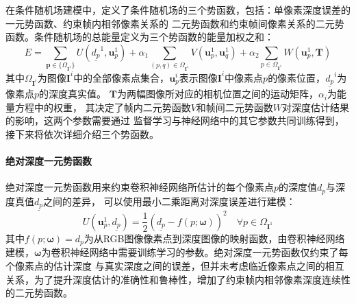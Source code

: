 在条件随机场建模中，定义了条件随机场的三个势函数，包括：单像素深度误差的一元势函数、约束帧内相邻像素关系的
二元势函数和约束帧间像素关系的二元势函数。条件随机场的总能量定义为三个势函数的能量加权之和：
\begin{equation}
    E = \sum_{\mathbf{p}\in \{\Omega_{\mathbf{I}^1}\}} U(\underline{d_{p}}^{1},\mathbf{u}_p^{1})+\alpha_1\sum_{(p,q)\in \Omega_{\mathbf{I}^1}}V(\mathbf{u}_p^1,\mathbf{u}_q^1)
    +\alpha_2\sum_{p\in\Omega_{\mathbf{I}^1}}W(\mathbf{u}_p^1,\mathbf{T})
\end{equation}
其中$\Omega_{\mathbf{I}^i}$为图像$\mathbf{I}^i$中的全部像素点集合，$\mathbf{u}_p^i$表示图像$\mathbf{I}^i$中像素点$p$的像素位置，$\underline{d_p}^{i}$为像素点$p$的深度真实值。
$\mathbf{T}$为两幅图像所对应的相机位置之间的运动矩阵，$\alpha_i$为能量方程中的权重，
其决定了帧内二元势函数$V$和帧间二元势函数$W$对深度估计结果的影响，这两个参数需要通过
监督学习与神经网络中的其它参数共同训练得到，接下来将依次详细介绍三个势函数。

\paragraph{绝对深度一元势函数}

绝对深度一元势函数用来约束卷积神经网络所估计的每个像素点$p$的深度值$d_p$与深度真值$\underline{d_p}$之间的差异，
可以使用最小二乘距离对深度误差进行建模：
\begin{equation}
    U(\mathbf{u}_{p}^1,\underline{d_p}) = \frac{1}{2}(\underline{d_p}-f(p;\mathbf{\omega}))^2 \quad  \forall p \in \Omega_{\mathbf{I}^1}
\end{equation}
其中$f(p;\mathbf{\omega})=d_p$为从RGB图像像素点到深度图像的映射函数，由卷积神经网络建模，$\mathbf{\omega}$为卷积神经网络中需要训练学习的参数。绝对深度一元势函数仅约束了每个像素点的估计深度
与真实深度之间的误差，但并未考虑临近像素点之间的相互关系，为了提升深度估计的准确性和鲁棒性，增加了约束帧内相邻像素深度连续性的二元势函数。

